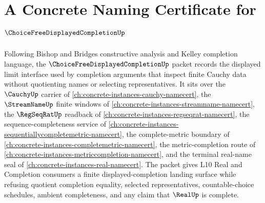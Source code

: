 \chapter{A Concrete Naming Certificate for $\ChoiceFreeDisplayedCompletionUp$}
\label{ch:concrete-instances-choice-free-displayed-completion-namecert}

Following Bishop and Bridges constructive analysis and Kelley completion language, the $\ChoiceFreeDisplayedCompletionUp$ packet records the displayed limit interface used by completion arguments that inspect finite Cauchy data without quotienting names or selecting representatives. It sits over the $\CauchyUp$ carrier of \autoref{ch:concrete-instances-cauchy-namecert}, the $\StreamNameUp$ finite windows of \autoref{ch:concrete-instances-streamname-namecert}, the $\RegSeqRatUp$ readback of \autoref{ch:concrete-instances-regseqrat-namecert}, the sequence-completeness service of \autoref{ch:concrete-instances-sequentiallycompletemetric-namecert}, the complete-metric boundary of \autoref{ch:concrete-instances-completemetric-namecert}, the metric-completion route of \autoref{ch:concrete-instances-metriccompletion-namecert}, and the terminal real-name seal of \autoref{ch:concrete-instances-real-namecert}. The packet gives L10 Real and Completion consumers a finite displayed-completion landing surface while refusing quotient completion equality, selected representatives, countable-choice schedules, ambient completeness, and any claim that $\RealUp$ is complete.

